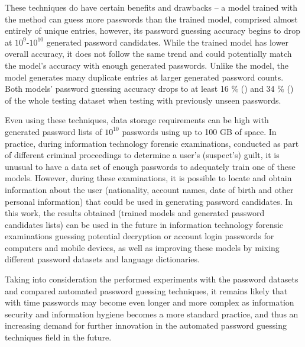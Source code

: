 \documentclass{VUMIFInfBakalaurinis}
\begin{document}
These techniques do have certain benefits and drawbacks -- a model trained with 
the  method can guess more passwords than the 
 trained model, comprised almost entirely of unique entries, 
however, its password guessing accuracy begins to drop at $10^9$-$10^{10}$ 
generated password candidates. While the  trained model has 
lower overall accuracy, it does not follow the same trend and could potentially 
match the  model's accuracy with enough generated passwords. 
Unlike the  model, the  model generates many 
duplicate entries at larger generated password counts. Both models' password 
guessing accuracy drops to at least 16 \% () and 34 \% 
() of the whole testing dataset when testing with previously 
unseen passwords.

Even using these techniques, data storage requirements can be high with 
generated password lists of $10^{10}$ passwords using up to 100 GB of space. In 
practice, during information technology forensic examinations, conducted as part 
of different criminal proceedings to determine a user's (suspect's) guilt, it is 
unusual to have a data set of enough passwords to adequately train one of these 
models. However, during these examinations, it is possible to locate and obtain 
information about the user (nationality, account names, date of birth and other 
personal information) that could be used in generating password candidates. In 
this work, the results obtained (trained models and generated password 
candidates lists) can be used in the future in information technology forensic 
examinations guessing potential decryption or account login passwords for 
computers and mobile devices, as well as improving these models by mixing 
different password datasets and language dictionaries.

Taking into consideration the performed experiments with the password datasets 
and compared automated password guessing techniques, it remains likely that with 
time passwords may become even longer and more complex as information security 
and information hygiene becomes a more standard practice, and thus an increasing 
demand for further innovation in the automated password guessing techniques 
field in the future.

\printbibliography[heading=bibintoc]

\appendix
\end{document}

